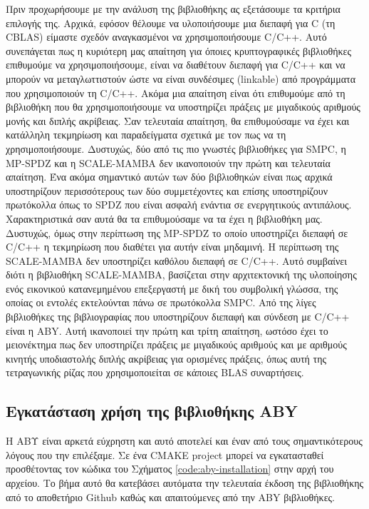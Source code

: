 Πριν προχωρήσουμε με την ανάλυση της βιβλιοθήκης ας εξετάσουμε τα κριτήρια επιλογής της. Αρχικά, εφόσον θέλουμε να υλοποιήσουμε μια διεπαφή για C (τη CBLAS) είμαστε σχεδόν αναγκασμένοι να χρησιμοποιήσουμε C/C++. Αυτό συνεπάγεται πως η κυριότερη μας απαίτηση για όποιες κρυπτογραφικές βιβλιοθήκες επιθυμούμε να χρησιμοποιήσουμε, είναι να διαθέτουν διεπαφή για C/C++ και να μπορούν να μεταγλωττιστούν ώστε να είναι συνδέσιμες (linkable) από προγράμματα που χρησιμοποιούν τη C/C++. Ακόμα μια απαίτηση είναι ότι επιθυμούμε από τη βιβλιοθήκη που θα χρησιμοποιήσουμε να υποστηρίζει πράξεις με μιγαδικούς αριθμούς μονής και διπλής ακρίβειας. Σαν τελευταία απαίτηση, θα επιθυμούσαμε να έχει και κατάλληλη τεκμηρίωση και παραδείγματα σχετικά με τον πως να τη χρησιμοποιήσουμε. Δυστυχώς, δύο από τις πιο γνωστές βιβλιοθήκες για SMPC, η MP-SPDZ και η SCALE-MAMBA δεν ικανοποιούν την πρώτη και τελευταία απαίτηση. Ένα ακόμα σημαντικό αυτών των δύο βιβλιοθηκών είναι πως αρχικά υποστηρίζουν περισσότερους των δύο συμμετέχοντες και επίσης υποστηρίζουν πρωτόκολλα όπως το SPDZ που είναι ασφαλή ενάντια σε ενεργητικούς αντιπάλους. Χαρακτηριστικά σαν αυτά θα τα επιθυμούσαμε να τα έχει η βιβλιοθήκη μας. Δυστυχώς, όμως στην περίπτωση της MP-SPDZ το οποίο υποστηρίζει διεπαφή σε C/C++ η τεκμηρίωση που διαθέτει για αυτήν είναι μηδαμινή. Η περίπτωση της SCALE-MAMBA δεν υποστηρίζει καθόλου διεπαφή σε C/C++. Αυτό συμβαίνει διότι η βιβλιοθήκη SCALE-MAMBA, βασίζεται στην αρχιτεκτονική της υλοποίησης ενός εικονικού κατανεμημένου επεξεργαστή με δική του συμβολική γλώσσα, της οποίας οι εντολές εκτελούνται πάνω σε πρωτόκολλα SMPC. Από της λίγες βιβλιοθήκες της βιβλιογραφίας που υποστηρίζουν διεπαφή και σύνδεση με C/C++ είναι η ABY. Αυτή ικανοποιεί την πρώτη και τρίτη απαίτηση, ωστόσο έχει το μειονέκτημα πως δεν υποστηρίζει πράξεις με μιγαδικούς αριθμούς και με αριθμούς κινητής υποδιαστολής διπλής ακρίβειας για ορισμένες πράξεις, όπως αυτή της τετραγωνικής ρίζας που χρησιμοποιείται σε κάποιες BLAS συναρτήσεις.

\subsection{Εγκατάσταση χρήση της βιβλιοθήκης ABY}

H ΑΒΥ είναι αρκετά εύχρηστη και αυτό αποτελεί και έναν από τους σημαντικότερους λόγους που την επιλέξαμε. Σε ένα CMAKE project μπορεί να εγκατασταθεί προσθέτοντας τον κώδικα του Σχήματος \ref{code:aby-installation} στην αρχή του αρχείου. Το βήμα αυτό θα κατεβάσει αυτόματα την τελευταία έκδοση της βιβλιοθήκης από το αποθετήριο Github καθώς και απαιτούμενες από την ABY βιβλιοθήκες.

